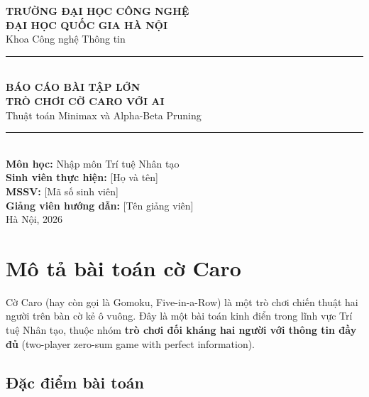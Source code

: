 \documentclass[12pt,a4paper]{article}
\begin{document}
\begin{titlepage}
    \centering
    \vspace*{1cm}

    {\large \textbf{TRƯỜNG ĐẠI HỌC CÔNG NGHỆ}}\\[0.3cm]
    {\large \textbf{ĐẠI HỌC QUỐC GIA HÀ NỘI}}\\[0.3cm]
    {\large Khoa Công nghệ Thông tin}\\[2cm]

    \rule{\textwidth}{1.5pt}\\[0.5cm]
    {\Huge \textbf{BÁO CÁO BÀI TẬP LỚN}}\\[0.3cm]
    {\LARGE \textbf{TRÒ CHƠI CỜ CARO VỚI AI}}\\[0.2cm]
    {\large Thuật toán Minimax và Alpha-Beta Pruning}\\[0.3cm]
    \rule{\textwidth}{1.5pt}\\[2cm]

    {\large \textbf{Môn học:} Nhập môn Trí tuệ Nhân tạo}\\[0.5cm]

    {\large \textbf{Sinh viên thực hiện:} [Họ và tên]}\\[0.3cm]
    {\large \textbf{MSSV:} [Mã số sinh viên]}\\[0.3cm]
    {\large \textbf{Giảng viên hướng dẫn:} [Tên giảng viên]}\\[2cm]

    \vfill
    {\large Hà Nội, 2026}
\end{titlepage}

\tableofcontents
\newpage

\section{Mô tả bài toán cờ Caro}

Cờ Caro (hay còn gọi là Gomoku, Five-in-a-Row) là một trò chơi chiến thuật hai người trên bàn cờ kẻ ô vuông. Đây là một bài toán kinh điển trong lĩnh vực Trí tuệ Nhân tạo, thuộc nhóm \textbf{trò chơi đối kháng hai người với thông tin đầy đủ} (two-player zero-sum game with perfect information).

\subsection{Đặc điểm bài toán}
\end{document}
